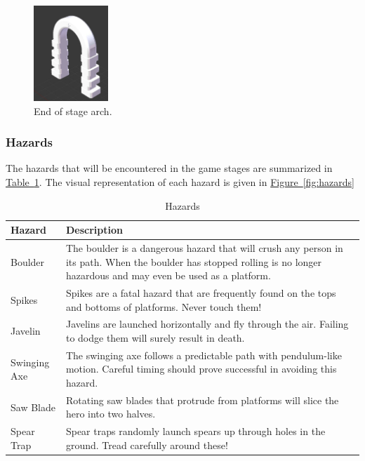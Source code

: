 \documentclass[12pt, titlepage]{article}
\begin{document}
\begin{figure}[H]
\begin{center}
\includegraphics[width=0.25\textwidth]{door}
\caption{End of stage arch.} \label{fig:arch}
\end{center}
\end{figure}

\subsubsection{Hazards}
The hazards that will be encountered in the game stages are summarized in \hyperref[tab:hazards]{Table~\ref*{tab:hazards}}.  The visual representation of each hazard is given in \hyperref[fig:hazards]{Figure~\ref*{fig:hazards}}

\begin{table}[H]
\caption{Hazards} \label{tab:hazards}
\renewcommand{\arraystretch}{1.2}
\begin{tabularx}{\textwidth}{p{4cm}X}
\toprule {\bf Hazard} & {\bf Description}\\
\midrule
Boulder & The boulder is a dangerous hazard that will crush any person in its path.  When the boulder has stopped rolling is no longer hazardous and may even be used as a platform.\\
Spikes & Spikes are a fatal hazard that are frequently found on the tops and bottoms of platforms.  Never touch them! \\
Javelin & Javelins are launched horizontally and fly through the air.  Failing to dodge them will surely result in death. \\
Swinging Axe & The swinging axe follows a predictable path with pendulum-like motion.  Careful timing should prove successful in avoiding this hazard. \\
Saw Blade & Rotating saw blades that protrude from platforms will slice the hero into two halves. \\
Spear Trap & Spear traps randomly launch spears up through holes in the ground.  Tread carefully around these!\\
\bottomrule
\end{tabularx}
\end{table}
\end{document}
